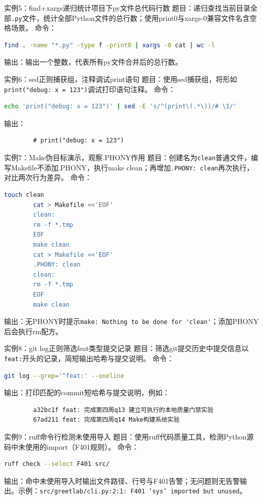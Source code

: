 \documentclass[a4paper,12pt]{ctexart}
\begin{document}
	实例5：find+xargs递归统计项目下py文件总代码行数
	题目：递归查找当前目录全部\texttt{.py}文件，统计全部Python文件的总行数；使用print0与xargs-0兼容文件名含空格场景。
	命令：
	\begin{lstlisting}[language=bash]
		find . -name "*.py" -type f -print0 | xargs -0 cat | wc -l
	\end{lstlisting}
	输出：输出一个整数，代表所有py文件合并后的总行数。
	
	实例6：sed正则捕获组，注释调试print语句
	题目：使用sed捕获组，将形如\texttt{print("debug: x = 123")}调试打印语句注释。
	命令：
	\begin{lstlisting}[language=bash]
		echo 'print("debug: x = 123")' | sed -E 's/^(print\(.*\))/# \1/'
	\end{lstlisting}
	输出：
	\begin{lstlisting}
		# print("debug: x = 123")
	\end{lstlisting}
	
	实例7：Make伪目标演示，观察.PHONY作用
	题目：创建名为\texttt{clean}普通文件，编写Makefile不添加.PHONY，执行make clean；再增加\texttt{.PHONY: clean}再次执行，对比两次行为差异。
	命令：
	\begin{lstlisting}[language=bash]
		touch clean
		cat > Makefile <<'EOF'
		clean:
		rm -f *.tmp
		EOF
		make clean
		cat > Makefile <<'EOF'
		.PHONY: clean
		clean:
		rm -f *.tmp
		EOF
		make clean
	\end{lstlisting}
	输出：无PHONY时提示\verb|make: Nothing to be done for 'clean'|；添加PHONY后会执行rm配方。
	
	实例8：git log正则筛选feat类型提交记录
	题目：筛选git提交历史中提交信息以\texttt{feat:}开头的记录，简短输出哈希与提交说明。
	命令：
	\begin{lstlisting}[language=bash]
		git log --grep='^feat:' --oneline
	\end{lstlisting}
	输出：打印匹配的commit短哈希与提交说明，例如：
	\begin{lstlisting}
		a32bc1f feat: 完成第四周q13 建立可执行的本地质量门禁实验
		67ad211 feat: 完成第四周q14 Make构建系统实验
	\end{lstlisting}
	
	实例9：ruff命令行检测未使用导入
	题目：使用ruff代码质量工具，检测Python源码中未使用的import（F401规则）。
	命令：
	\begin{lstlisting}[language=bash]
		ruff check --select F401 src/
	\end{lstlisting}
	输出：命中未使用导入时输出文件路径、行号与F401告警；无问题则无告警输出。示例：\texttt{src/greetlab/cli.py:2:1: F401 `sys' imported but unused}。
	
\end{document}
